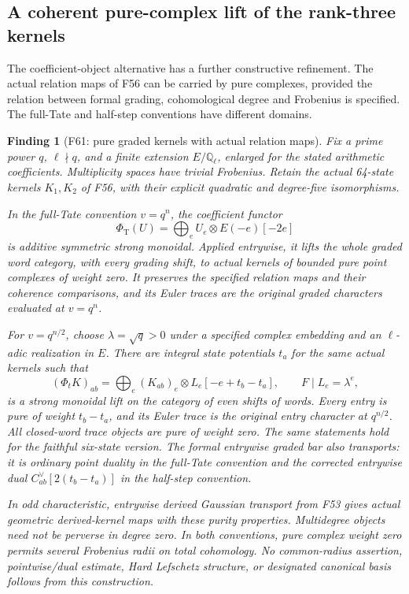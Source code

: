 \documentclass[11pt,a4paper]{article}
\newcommand{\fid}[1]{\textsf{#1}}\newcommand{\gate}[1]{\textsf{#1}}
\theoremstyle{named}\newtheorem{finding}{Finding}[section]
\theoremstyle{definition}\newtheorem{definition}[finding]{Definition}
\theoremstyle{remark}\newtheorem{remark}[finding]{Remark}
\begin{document}
\subsection{A coherent pure-complex lift of the rank-three kernels}

The coefficient-object alternative has a further constructive
refinement. The actual relation maps of \fid{F56} can be carried
by pure complexes, provided the relation between formal grading,
cohomological degree and Frobenius is specified. The full-Tate
and half-step conventions have different domains.

\begin{finding}[\fid{F61}: pure graded kernels with actual relation maps]
\label{f:purerankthreekernels}
Fix a prime power \(q\), \(\ell\nmid q\), and a finite extension
\(E/\mathbb Q_\ell\), enlarged for the stated arithmetic
coefficients. Multiplicity spaces have trivial Frobenius.
Retain the actual
64-state kernels \(K_1,K_2\) of \fid{F56}, with their explicit
quadratic and degree-five isomorphisms.

In the full-Tate convention \(v=q^n\), the coefficient functor
\begin{equation}\label{eq:fullTatekernelLift}
 \Phi_{\mathrm T}(U)
   =\bigoplus_e U_e\otimes E(-e)[-2e]
\end{equation}
is additive symmetric strong monoidal. Applied entrywise, it
lifts the whole graded word category, with every grading shift,
to actual kernels of bounded pure point complexes of weight zero.
It preserves the specified relation maps and their coherence
comparisons, and its Euler traces are the original graded
characters evaluated at \(v=q^n\).

For \(v=q^{n/2}\), choose \(\lambda=\sqrt q>0\) under a specified
complex embedding and an \(\ell\)-adic realization in \(E\).
There are integral state potentials \(t_a\) for the same
actual kernels such that
\begin{equation}\label{eq:halfstepkernelLift}
 (\Phi_tK)_{ab}
   =\bigoplus_e (K_{ab})_e\otimes L_e[-e+t_b-t_a],
 \qquad F\mid L_e=\lambda^e,
\end{equation}
is a strong monoidal lift on the category of even shifts of
words. Every entry is pure of weight \(t_b-t_a\), and its Euler
trace is the original entry character at \(q^{n/2}\).
All closed-word trace objects are pure of weight zero.
The same statements hold for the faithful six-state version.
The formal entrywise graded bar also transports: it is ordinary
point duality in the full-Tate convention and the corrected
entrywise dual \(C_{ab}^\vee[2(t_b-t_a)]\) in the half-step
convention.

In odd characteristic, entrywise derived Gaussian transport
from \fid{F53} gives actual geometric derived-kernel maps with
these purity properties. Multidegree objects need not be
perverse in degree zero. In both conventions, pure complex
weight zero permits several Frobenius radii on total
cohomology. No common-radius assertion, pointwise/dual
estimate, Hard Lefschetz structure, or designated canonical
basis follows from this construction.
\end{finding}
\end{document}
